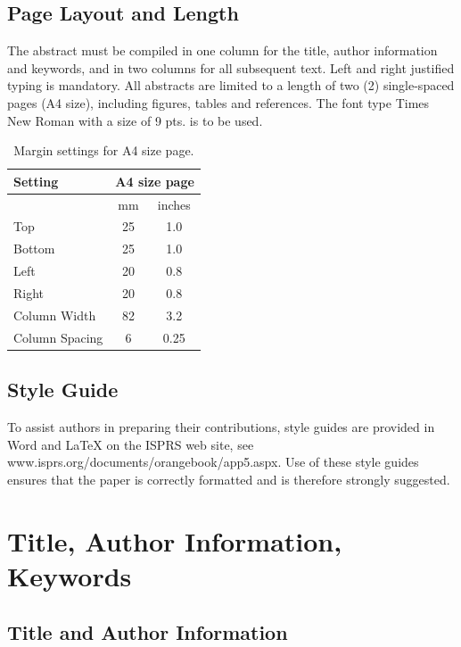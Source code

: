 \documentclass{isprs} %
\begin{document}
\subsection{Page Layout and Length}\label{sec:Page Layout, Spacing and Margins}

The abstract must be compiled in one column for the title, author information and keywords, and in two columns for all subsequent text. Left and right justified typing is mandatory. All abstracts are limited to a length of two (2) single-spaced pages (A4 size), including figures, tables and references. The font type Times New Roman with a size of 9 pts. is to be used.

\begin{table}[h]
	\centering
		\begin{tabular}{|l|c|c|}\hline
			Setting&\multicolumn{2}{c|}{A4 size page}\\\hline
			  &mm&inches\\
			 Top&25&1.0\\
			 Bottom&25&1.0\\
			 Left&20&0.8\\
			 Right&20&0.8\\
			 Column Width&82&3.2\\
			 Column Spacing&6&0.25\\\hline
		\end{tabular}
	\caption{Margin settings for A4 size page.}
\label{tab:Margin_settings}
\end{table}

\subsection{Style Guide}\label{sec:Preparation in electronic form}

To assist authors in preparing their contributions, style guides are provided in Word and LaTeX on the ISPRS web site, see www.isprs.org/documents/orangebook/app5.aspx. Use of these style guides ensures that the paper is correctly formatted and is therefore strongly suggested.


\section{Title, Author Information, Keywords}\label{sec:TITLE AND ABSTRACT BLOCK}

\subsection{Title and Author Information}\label{sec:Title}
\end{document}
